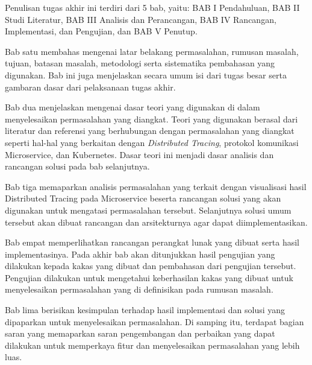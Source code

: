 Penulisan tugas akhir ini terdiri dari 5 bab, yaitu: BAB I Pendahuluan, BAB II Studi Literatur, BAB III Analisis dan Perancangan, BAB IV Rancangan, Implementasi, dan Pengujian, dan BAB V Penutup.

Bab satu membahas mengenai latar belakang permasalahan, rumusan masalah, tujuan, batasan masalah, metodologi serta sistematika pembahasan yang digunakan. Bab ini juga menjelaskan secara umum isi dari tugas besar serta gambaran dasar dari pelaksanaan tugas akhir.

Bab dua menjelaskan mengenai dasar teori yang digunakan di dalam menyelesaikan permasalahan yang diangkat. Teori yang digunakan berasal dari literatur dan referensi yang berhubungan dengan permasalahan yang diangkat seperti hal-hal yang berkaitan dengan \textit{Distributed Tracing}, protokol komunikasi Microservice, dan Kubernetes. Dasar teori ini menjadi dasar analisis dan rancangan solusi pada bab selanjutnya.

Bab tiga memaparkan analisis permasalahan yang terkait dengan visualisasi hasil Distributed Tracing pada Microservice beserta rancangan solusi yang akan digunakan untuk mengatasi permasalahan tersebut. Selanjutnya solusi umum tersebut akan dibuat rancangan dan arsitekturnya agar dapat diimplementasikan.

Bab empat memperlihatkan rancangan perangkat lunak yang dibuat serta hasil implementasinya. Pada akhir bab akan ditunjukkan hasil pengujian yang dilakukan kepada kakas yang dibuat dan pembahasan dari pengujian tersebut. Pengujian dilakukan untuk mengetahui keberhasilan kakas yang dibuat untuk menyelesaikan permasalahan yang di definisikan pada rumusan masalah.

Bab lima berisikan kesimpulan terhadap hasil implementasi dan solusi yang dipaparkan untuk menyelesaikan permasalahan. Di samping itu, terdapat bagian saran yang memaparkan saran pengembangan dan perbaikan yang dapat dilakukan untuk memperkaya fitur dan menyelesaikan permasalahan yang lebih luas.

